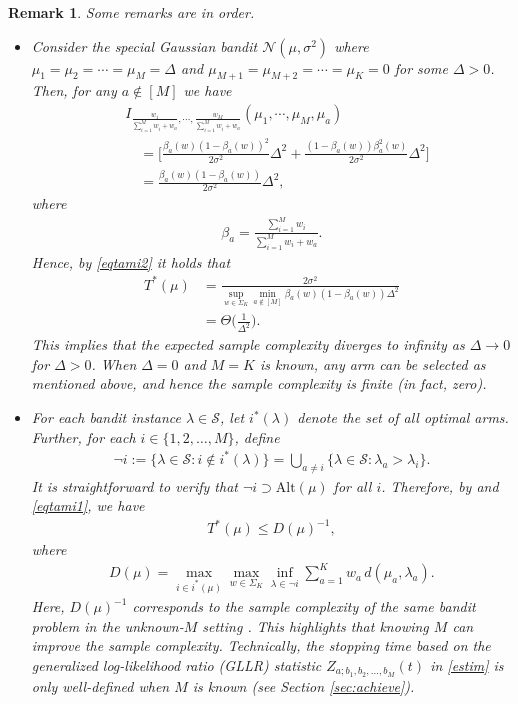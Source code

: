 \documentclass[final]{IEEEtran}
\newcommand{\nn}{\nonumber}
\newcommand{\calN}{\mathcal{N}}
\newtheorem{remark}[theorem]{Remark}
\begin{document}
\begin{remark} Some remarks are in order.
\begin{itemize}
\item Consider the special Gaussian bandit $\calN(\mu,\sigma^2)$ where $\mu_1=\mu_2=\cdots =\mu_M=\Delta$ and $\mu_{M+1}=\mu_{M+2}=\cdots=\mu_K=0$ for some $\Delta>0$. Then, for any $a \notin [M]$ we have
\begin{align}
& I_{\frac{w_1}{\sum_{i=1}^M w_i+w_a},  \cdots, \frac{w_M}{\sum_{i=1}^M w_i +w_a}}(\mu_1,\cdots, \mu_M, \mu_a)\nn\\
&\quad =\bigg[\frac{\beta_a(w) (1-\beta_a(w))^2}{2\sigma^2} \Delta^2+ \frac{(1-\beta_a(w)) \beta_a^2(w)}{2\sigma^2} \Delta^2\bigg] \nn \\
&\quad=\frac{\beta_a(w) (1-\beta_a(w))}{2\sigma^2} \Delta^2,
\end{align} where
\begin{align}
\beta_a=\frac{\sum_{i=1}^M w_i}{\sum_{i=1}^M w_i +w_a}. 
\end{align}
Hence, by \eqref{eqtami2} it holds that
\begin{align}
T^*(\mu)&=\frac{2\sigma^2 }{\sup_{w \in \Sigma_K} \min_{a \notin [M]} \beta_a(w)(1-\beta_a(w)) \Delta^2}\nn\\
&=\Theta\bigg(\frac{1}{\Delta^2}\bigg).
\end{align}
This implies that the expected sample complexity diverges to infinity as $\Delta \to 0$ for $\Delta > 0$. When $\Delta = 0$ and $M = K$ is known, any arm can be selected as mentioned above, and hence the sample complexity is finite (in fact, zero).
\item For each bandit instance $\lambda \in \mathcal{S}$, let $i^*(\lambda)$ denote the set of all optimal arms. Further, for each $i \in \{1,2,\dots,M\}$, define
\begin{align*}
\neg i := \{\lambda \in \mathcal{S} : i \notin i^*(\lambda)\} = \bigcup_{a \neq i} \{\lambda \in \mathcal{S} : \lambda_a > \lambda_i\}.
\end{align*}
It is straightforward to verify that $\neg i \supset \text{Alt}(\mu)$ for all $i$. Therefore, by \cite[Theorem 1]{Degenne2019PureEW} and \eqref{eqtami1}, we have
\begin{align*}
T^*(\mu) \leq D(\mu)^{-1}, 
\end{align*}
where
\begin{align}
 D(\mu) = \max_{i \in i^*(\mu)} \max_{w \in \Sigma_K} \inf_{\lambda \in \neg i} \sum_{a=1}^K w_a \, d(\mu_a, \lambda_a).
 \end{align}
Here, $D(\mu)^{-1}$ corresponds to the sample complexity of the same bandit problem in the unknown-$M$ setting \cite{Degenne2019PureEW}. This highlights that knowing $M$ can improve the sample complexity. Technically, the stopping time based on the generalized log-likelihood ratio (GLLR) statistic $Z_{a; b_1, b_2, \dots, b_M}(t)$ in \eqref{estim} is only well-defined when $M$ is known (see Section \ref{sec:achieve}).
\end{itemize}
\end{remark}
\end{document}

